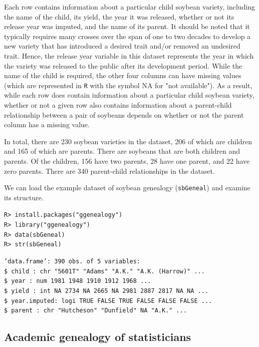 \documentclass[11pt,a4paper,oldfontcommands,openany]{memoir}
\DeclareRobustCommand{\mybox}[2][gray!15]{%
\begin{tcolorbox}[   %
        breakable,
        left=0pt,
        right=0pt,
        top=0pt,
        bottom=0pt,
        colback=#1,
        colframe=#1,
        width=\dimexpr\textwidth\relax, 
        enlarge left by=0mm,
        boxsep=5pt,
        arc=0pt,outer arc=0pt,
        ]
        #2
\end{tcolorbox}
}
\numberwithin{equation}{section} %
\newcommand{\code}[1]{{\texttt{#1}}}
\newcommand{\pkg}[1]{{\texttt{#1}}}
\begin{document}
Each row contains information about a particular child soybean variety, including the name of the child, its yield, the year it was released, whether or not its release year was imputed, and the name of its parent. It should be noted that it typically requires many crosses over the span of one to two decades to develop a new variety that has introduced a desired trait and/or removed an undesired trait. Hence, the release year variable in this dataset represents the year in which the variety was released to the public after its development period. While the name of the child is required, the other four columns can have missing values (which are represented in \pkg{R} with the symbol NA for "not available"). As a result, while each row does contain information about a particular child soybean variety, whether or not a given row also contains information about a parent-child relationship between a pair of soybeans depends on whether or not the parent column has a missing value.

In total, there are 230 soybean varieties in the dataset, 206 of which are children and 165 of which are parents. There are soybeans that are both children and parents. Of the children, 156 have two parents, 28 have one parent, and 22 have zero parents. There are 340 parent-child relationships in the dataset.

We can load the example dataset of soybean genealogy (\code{sbGeneal}) and examine its structure. 

\mybox{
\texttt{R> install.packages("ggenealogy")}\\
\texttt{R> library("ggenealogy")}\\
\texttt{R> data(sbGeneal)}\\
\texttt{R> str(sbGeneal)}
}

\mybox[green!10]{
\texttt{'data.frame':	390 obs. of  5 variables:}\\
\texttt{\$ child       : chr  "5601T" "Adams" "A.K." "A.K. (Harrow)" ...}\\
\texttt{\$ year        : num  1981 1948 1910 1912 1968 ...}\\
\texttt{\$ yield       : int  NA 2734 NA 2665 NA 2981 2887 2817 NA NA ...}\\
\texttt{\$ year.imputed: logi  TRUE FALSE TRUE FALSE FALSE FALSE ...}\\
\texttt{\$ parent      : chr  "Hutcheson" "Dunfield" NA "A.K." ...}
}

\subsection{Academic genealogy of statisticians}
\end{document}
